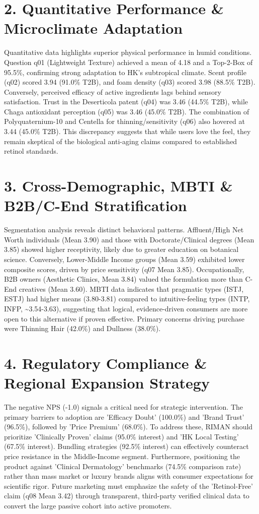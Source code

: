 \documentclass[10pt,twocolumn,a4paper]{article}
\begin{document}
\section{2. Quantitative Performance \& Microclimate Adaptation}
Quantitative data highlights superior physical performance in humid conditions. Question q01 (Lightweight Texture) achieved a mean of 4.18 and a Top-2-Box of 95.5\%, confirming strong adaptation to HK's subtropical climate. Scent profile (q02) scored 3.94 (91.0\% T2B), and foam density (q03) scored 3.98 (88.5\% T2B). Conversely, perceived efficacy of active ingredients lags behind sensory satisfaction. Trust in the Deserticola patent (q04) was 3.46 (44.5\% T2B), while Chaga antioxidant perception (q05) was 3.46 (45.0\% T2B). The combination of Polyquaternium-10 and Centella for thinning/sensitivity (q06) also hovered at 3.44 (45.0\% T2B). This discrepancy suggests that while users love the feel, they remain skeptical of the biological anti-aging claims compared to established retinol standards.
\section{3. Cross-Demographic, MBTI \& B2B/C-End Stratification}
Segmentation analysis reveals distinct behavioral patterns. Affluent/High Net Worth individuals (Mean 3.90) and those with Doctorate/Clinical degrees (Mean 3.85) showed higher receptivity, likely due to greater education on botanical science. Conversely, Lower-Middle Income groups (Mean 3.59) exhibited lower composite scores, driven by price sensitivity (q07 Mean 3.85). Occupationally, B2B owners (Aesthetic Clinics, Mean 3.84) valued the formulation more than C-End creatives (Mean 3.60). MBTI data indicates that pragmatic types (ISTJ, ESTJ) had higher means (3.80-3.81) compared to intuitive-feeling types (INTP, INFP, \textasciitilde{}3.54-3.63), suggesting that logical, evidence-driven consumers are more open to this alternative if proven effective. Primary concerns driving purchase were Thinning Hair (42.0\%) and Dullness (38.0\%).
\section{4. Regulatory Compliance \& Regional Expansion Strategy}
The negative NPS (-1.0) signals a critical need for strategic intervention. The primary barriers to adoption are 'Efficacy Doubt' (100.0\%) and 'Brand Trust' (96.5\%), followed by 'Price Premium' (68.0\%). To address these, RIMAN should prioritize 'Clinically Proven' claims (95.0\% interest) and 'HK Local Testing' (67.5\% interest). Bundling strategies (92.5\% interest) can effectively counteract price resistance in the Middle-Income segment. Furthermore, positioning the product against 'Clinical Dermatology' benchmarks (74.5\% comparison rate) rather than mass market or luxury brands aligns with consumer expectations for scientific rigor. Future marketing must emphasize the safety of the 'Retinol-Free' claim (q08 Mean 3.42) through transparent, third-party verified clinical data to convert the large passive cohort into active promoters.
\end{document}
